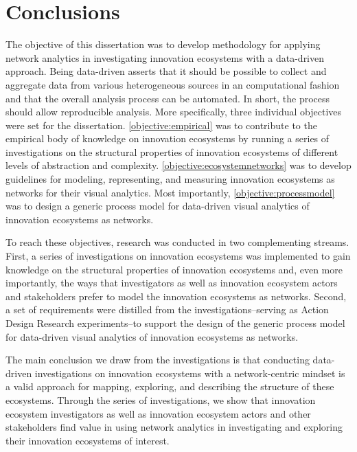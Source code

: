 \chapter{Conclusions}
\label{ch:conclusions}

The objective of this dissertation was to develop methodology for applying network analytics in investigating innovation ecosystems with a data-driven approach. Being data-driven asserts that it should be possible to collect and aggregate data from various heterogeneous sources in an computational fashion and that the overall analysis process can be automated. In short, the process should allow reproducible analysis. More specifically, three individual objectives were set for the dissertation. \ref{objective:empirical} was to contribute to the empirical body of knowledge on innovation ecosystems by running a series of investigations on the structural properties of innovation ecosystems of different levels of abstraction and complexity. \ref{objective:ecosystemnetworks} was to develop guidelines for modeling, representing, and measuring innovation ecosystems as networks for their visual analytics. Most importantly, \ref{objective:processmodel} was to design a generic process model for data-driven visual analytics of innovation ecosystems as networks.

To reach these objectives, research was conducted in two complementing streams. First, a series of investigations on innovation ecosystems was implemented to gain knowledge on the structural properties of innovation ecosystems and, even more importantly, the ways that investigators as well as innovation ecosystem actors and stakeholders prefer to model the innovation ecosystems as networks. Second, a set of requirements were distilled from the investigations--serving as Action Design Research \citep{Sein2011ActionResearch} experiments--to support the design of the generic process model for data-driven visual analytics of innovation ecosystems as networks.

The main conclusion we draw from the investigations is that conducting data-driven investigations on innovation ecosystems with a network-centric mindset is a valid approach for mapping, exploring, and describing the structure of these ecosystems. Through the series of investigations, we show that innovation ecosystem investigators as well as innovation ecosystem actors and other stakeholders find value in using network analytics in investigating and exploring their innovation ecosystems of interest. 

